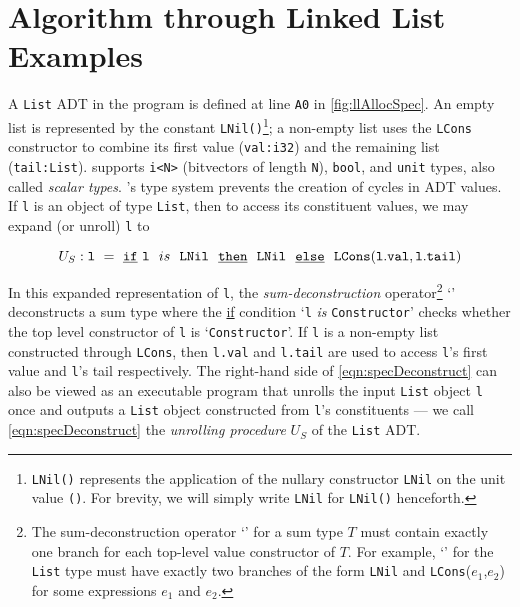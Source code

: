 \section{Algorithm through Linked List Examples}
A {\tt List} ADT in the
\SpecL{} program is defined at line {\tt A0}
in \cref{fig:llAllocSpec}. An empty list is represented
by the
constant {\tt LNil()}\footnote{{\tt LNil()} represents the application
of the nullary constructor {\tt LNil} on the unit value {\tt ()}. For brevity,
we will simply write {\tt LNil} for {\tt LNil()} henceforth.};
a non-empty list uses
the {\tt LCons} constructor to combine its first value ({\tt val:i32})
and the remaining list ({\tt tail:List}).
\SpecL{} supports
{\tt i<N>} (bitvectors of length {\tt N}),
{\tt bool}, and {\tt unit} types, also called {\em scalar types}.
\SpecL{}'s type system prevents
the creation of cycles in ADT values.
If {\tt l} is
an object of type {\tt List}, then to access its
constituent values, we may expand (or unroll) {\tt l} to
\begin{small}
\begin{equation}\label{eqn:specDeconstruct}
U_S: {\tt l\ =\ \underline{if}\ l}\ \ is\ \ {\tt LNil\ \ \underline{then}\ \ LNil\ \ \underline{else}\ \ LCons(l.val,l.tail)}
\end{equation}
\end{small}
In this expanded representation of {\tt l},
the {\em sum-deconstruction} operator\footnote{The sum-deconstruction operator `\sumDtor{}' for a sum type $T$ must contain exactly one branch for each top-level value constructor of $T$.
For example, `\sumDtor{}' for the {\tt List} type must have exactly two branches of the form {\tt LNil} and {\tt LCons}($e_1$,$e_2$) for some expressions $e_1$ and $e_2$.}
`\sumDtor{}'
deconstructs a sum type where the
\underline{if} condition `{\tt l} {\em is} {\tt Constructor}'
checks whether the top level constructor of {\tt l} is `{\tt Constructor}'.
If {\tt l}
is a non-empty list constructed through {\tt LCons},
then {\tt l.val} and {\tt l.tail}
are used to access {\tt l}'s first value and {\tt l}'s tail respectively.
The right-hand side of
\cref{eqn:specDeconstruct} can also be viewed as an executable
program that unrolls the input {\tt List} object {\tt l} once and
outputs a {\tt List} object constructed from {\tt l}'s constituents --- we
call \cref{eqn:specDeconstruct} the {\em unrolling procedure} $U_S$ of the {\tt List} ADT.



